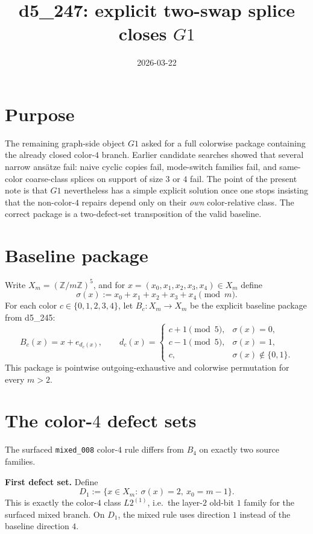 \documentclass[11pt]{article}
\title{d5\_247: explicit two-swap splice closes \(G1\)}
\author{}
\date{2026-03-22}
\begin{document}
\maketitle

\section{Purpose}
The remaining graph-side object \(G1\) asked for a full colorwise package
containing the already closed color-\(4\) branch.
Earlier candidate searches showed that several narrow ans\"atze fail:
naive cyclic copies fail, mode-switch families fail, and same-color coarse-class
splices on support of size \(3\) or \(4\) fail.
The point of the present note is that \(G1\) nevertheless has a simple explicit
solution once one stops insisting that the non-color-\(4\) repairs depend only
on their \emph{own} color-relative class.
The correct package is a two-defect-set transposition of the valid baseline.

\section{Baseline package}
Write \(X_m=(\mathbb Z/m\mathbb Z)^5\), and for
\(x=(x_0,x_1,x_2,x_3,x_4)\in X_m\) define
\[
\sigma(x):=x_0+x_1+x_2+x_3+x_4 \pmod m.
\]
For each color \(c\in\{0,1,2,3,4\}\), let \(B_c\colon X_m\to X_m\) be the
explicit baseline package from d5\_245:
\[
B_c(x)=x+e_{d_c(x)},
\qquad
d_c(x)=
\begin{cases}
c+1 \pmod 5, & \sigma(x)=0,\\
c-1 \pmod 5, & \sigma(x)=1,\\
c, & \sigma(x)\notin\{0,1\}.
\end{cases}
\]
This package is pointwise outgoing-exhaustive and colorwise permutation for every
\(m>2\).

\section{The color-\(4\) defect sets}
The surfaced \texttt{mixed\_008} color-\(4\) rule differs from \(B_4\) on
exactly two source families.

\medskip
\noindent\textbf{First defect set.}
Define
\[
D_1:=\{x\in X_m:\ \sigma(x)=2,\ x_0=m-1\}.
\]
This is exactly the color-\(4\) class \(L2^{(1)}\), i.e.\ the layer-\(2\) old-bit
\(1\) family for the surfaced mixed branch.
On \(D_1\), the mixed rule uses direction \(1\) instead of the baseline
direction \(4\).
\end{document}
